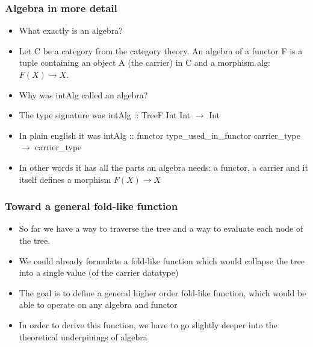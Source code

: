 \documentclass[10pt]{beamer}
\begin{document}
\begin{frame}[fragile]
\frametitle{Algebra in more detail}
\begin{itemize}
\item What exactly is an algebra? 
\item Let C be a category from the category theory. An algebra of a functor F is a tuple containing an object A (the carrier) in C and a morphism alg:$F(X) \rightarrow X$. 
\item Why was intAlg called an algebra?
\item The type signature was intAlg :: TreeF Int Int $\rightarrow$ Int
\item In plain english it was intAlg :: functor type\_used\_in\_functor carrier\_type $\rightarrow$ carrier\_type
\item In other words it has all the parts an algebra needs: a functor, a carrier and it itself defines a morphism $F(X) \rightarrow X$
\end{itemize}

\end{frame}



\begin{frame}[fragile]
\frametitle{Toward a general fold-like function}
\begin{itemize}
\item So far we have a way to traverse the tree and a way to evaluate each node of the tree.
\item We could already formulate a fold-like function which would collapse the tree into a single value (of the carrier datatype)	
\item The goal is to define a general higher order fold-like function, which would be able to operate on any algebra and functor
\item In order to derive this function, we have to go slightly deeper into the theoretical underpinings of algebra 
\end{itemize}



\end{frame}
\end{document}
